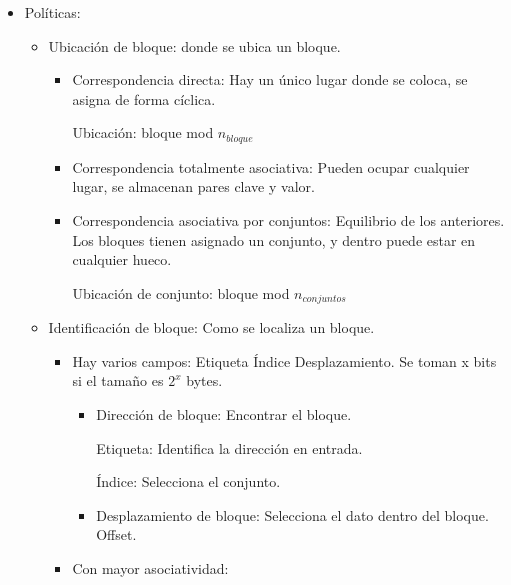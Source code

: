 \documentclass[12pt, twoside, openright]{report} %
\begin{document}
    \begin{itemize}
    
    \item
      Políticas:

      \begin{itemize}
      
      \item
        Ubicación de bloque: donde se ubica un bloque.

        \begin{itemize}
        
        \item
          Correspondencia directa: Hay un único lugar donde se coloca,
          se asigna de forma cíclica.

          
            Ubicación: bloque mod \(n_{bloque}\)

            \item
          Correspondencia totalmente asociativa: Pueden ocupar cualquier
          lugar, se almacenan pares clave y valor.
        \item
          Correspondencia asociativa por conjuntos: Equilibrio de los
          anteriores. Los bloques tienen asignado un conjunto, y dentro
          puede estar en cualquier hueco.

          
            Ubicación de conjunto: bloque mod \(n_{conjuntos}\)

          \end{itemize}
      \item
        Identificación de bloque: Como se localiza un bloque.

        \begin{itemize}
        
        \item
          Hay varios campos: Etiqueta \textbar{} Índice \textbar{}
          Desplazamiento. Se toman x bits si el tamaño es \(2^x\) bytes.

          \begin{itemize}
          
          \item Dirección de bloque: Encontrar el bloque.

              Etiqueta: Identifica la dirección en entrada.

              Índice: Selecciona el conjunto.

          \item Desplazamiento de bloque: Selecciona el dato dentro del
            bloque. Offset.
          \end{itemize}
        \item
          Con mayor asociatividad:


\end{itemize}
\end{itemize}
\end{itemize}
\end{document}
